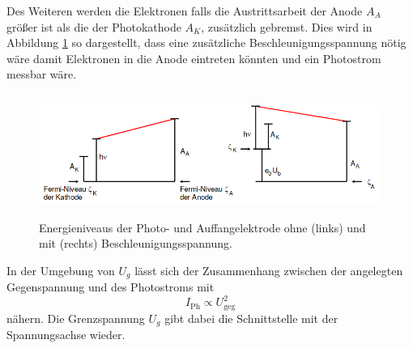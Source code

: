 Des Weiteren werden die Elektronen falls die Austrittsarbeit der Anode $A_A$ größer ist als die der Photokathode $A_K$, zusätzlich gebremst.
Dies wird in Abbildung \ref{fig:arbeit} so dargestellt, dass eine zusätzliche Beschleunigungsspannung nötig wäre damit Elektronen in die Anode eintreten könnten und ein Photostrom messbar wäre.

\begin{figure}[h]
    \centering
    \includegraphics[height=4cm]{Theorie/Energie.png}
    \caption{Energieniveaus der Photo- und Auffangelektrode ohne (links) und mit (rechts) Beschleunigungsspannung.}
    \label{fig:arbeit}
\end{figure}

In der Umgebung von $U_g$ lässt sich der Zusammenhang zwischen der angelegten Gegenspannung und des Photostroms mit
\begin{equation}
    \label{eqn:prop}
    I_\text{Ph} \propto U_\text{geg}^2
\end{equation}
nähern.
Die Grenzspannung $U_g$ gibt dabei die Schnittstelle mit der Spannungsachse wieder.
